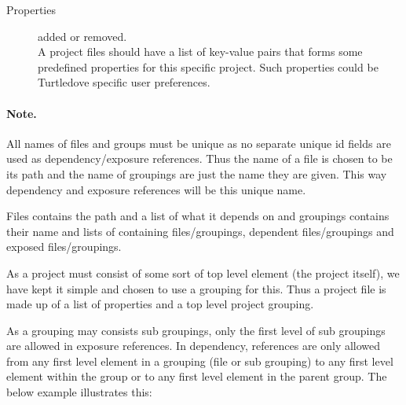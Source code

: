 \begin{description}
\item[Properties] added or removed. \\

  A project files should have a list of key-value pairs that forms some
  predefined properties for this specific project. Such properties could be
  Turtledove specific user preferences.

\end{description}

\paragraph{Note.} All names of files and groups must be unique as no separate
unique id fields are used as dependency/exposure references. Thus the name of a
file is chosen to be its path and the name of groupings are just the name they
are given. This way dependency and exposure references will be this unique name.

Files contains the path and a list of what it depends on and groupings contains
their name and lists of containing files/groupings, dependent files/groupings
and exposed files/groupings.

As a project must consist of some sort of top level element (the project
itself), we have kept it simple and chosen to use a grouping for this. Thus a
project file is made up of a list of properties and a top level project
grouping.

As a grouping may consists sub groupings, only the first level of sub groupings
are allowed in exposure references. In dependency, references are
only allowed from any first level element in a grouping (file or sub grouping)
to any first level element within the group or to any first level element in the
parent group. The below example illustrates this:

